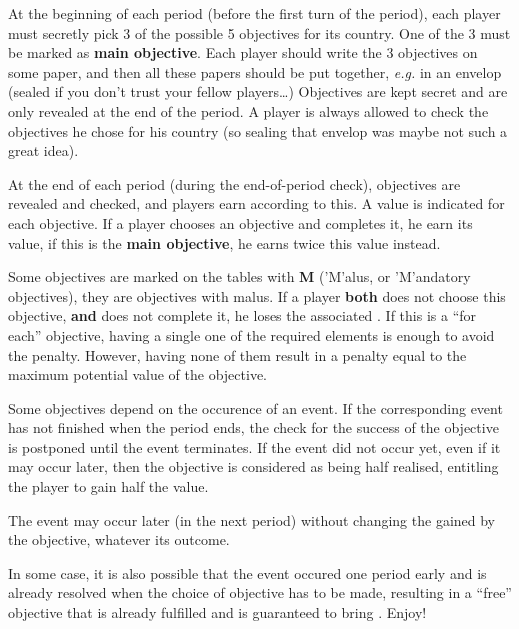 \bparag At the beginning of each period (before the first turn of the
period), each player must secretly pick 3 of the possible 5 objectives
for its country.
\bparag One of the 3 must be marked as \textbf{main objective}.
\bparag Each player should write the 3 objectives on some paper, and then all
these papers should be put together, \emph{e.g.} in an envelop (sealed if you
don't trust your fellow players\ldots)
\bparag Objectives are kept secret and are only revealed at the end of
the period. A player is always allowed to check the objectives he
chose for his country (so sealing that envelop was maybe not such a
great idea).

\bparag At the end of each period (during the end-of-period \VPs check),
objectives are revealed and checked, and players earn \VPs according to
this.
\bparag A \VPs value is indicated for each objective. If a player
chooses an objective and completes it, he earn its \VPs value, if this
is the \textbf{main objective}, he earns twice this value instead.

\bparag Some objectives are marked on the tables with {\bf M} ('M'alus, or
'M'andatory objectives), they are objectives with malus.
\bparag If a player \textbf{both} does not choose this objective, \textbf{and}
does not complete it, he loses the associated \VPs.
\bparag If this is a ``for each'' objective, having a single one of the
required elements is enough to avoid the penalty. However, having none
of them result in a penalty equal to the maximum potential value of the
objective.


\bparag Some objectives depend on the occurence of an event.
\bparag If the corresponding event has not finished %
when the period ends, the check for the success of the objective is
postponed until the event %
terminates.
\bparag If the event did not occur yet, even if it may occur later, then
the objective is considered as being half realised, entitling the player
to gain half the \VPs value.

\begin{designnote}
  The event may occur later (in the next period) without changing the
  \VPs gained by the objective, whatever its outcome.

  In some case, it is also possible that the event occured one period
  early and is already resolved when the choice of objective has to be
  made, resulting in a ``free'' objective that is already fulfilled and
  is guaranteed to bring \VPs. Enjoy!
\end{designnote}

